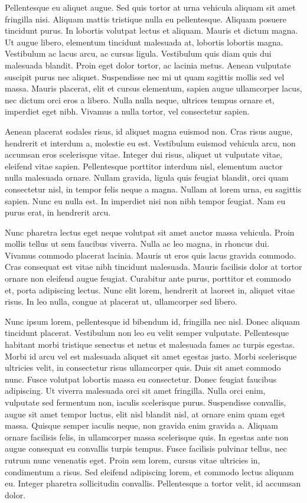 Pellentesque eu aliquet augue. Sed quis tortor at urna vehicula
aliquam sit amet fringilla nisi. Aliquam mattis tristique nulla eu
pellentesque. Aliquam posuere tincidunt purus. In lobortis volutpat
lectus et aliquam. Mauris et dictum magna. Ut augue libero, elementum
tincidunt malesuada at, lobortis lobortis magna. Vestibulum ac lacus
arcu, ac cursus ligula. Vestibulum quis diam quis dui malesuada
blandit. Proin eget dolor tortor, ac lacinia metus. Aenean vulputate
suscipit purus nec aliquet. Suspendisse nec mi ut quam sagittis mollis
sed vel massa. Mauris placerat, elit et cursus elementum, sapien augue
ullamcorper lacus, nec dictum orci eros a libero. Nulla nulla neque,
ultrices tempus ornare et, imperdiet eget nibh. Vivamus a nulla
tortor, vel consectetur sapien.

Aenean placerat sodales risus, id aliquet magna euismod non. Cras
risus augue, hendrerit et interdum a, molestie eu est. Vestibulum
euismod vehicula arcu, non accumsan eros scelerisque vitae. Integer
dui risus, aliquet ut vulputate vitae, eleifend vitae
sapien. Pellentesque porttitor interdum nisl, elementum auctor nulla
malesuada ornare. Nullam gravida, ligula quis feugiat blandit, orci
quam consectetur nisl, in tempor felis neque a magna. Nullam at lorem
urna, eu sagittis sapien. Nunc eu nulla est. In imperdiet nisi non
nibh tempor feugiat. Nam eu purus erat, in hendrerit arcu.

Nunc pharetra lectus eget neque volutpat sit amet auctor massa
vehicula. Proin mollis tellus ut sem faucibus viverra. Nulla ac leo
magna, in rhoncus dui. Vivamus commodo placerat lacinia. Mauris ut
eros quis lacus gravida commodo. Cras consequat est vitae nibh
tincidunt malesuada. Mauris facilisis dolor at tortor ornare non
eleifend augue feugiat. Curabitur ante purus, porttitor et commodo et,
porta adipiscing lectus. Nunc elit lorem, hendrerit at laoreet in,
aliquet vitae risus. In leo nulla, congue at placerat ut, ullamcorper
sed libero.

Nunc ipsum lorem, pellentesque id bibendum id, fringilla nec
nisl. Donec aliquam tincidunt placerat. Vestibulum non leo eu velit
semper vulputate. Pellentesque habitant morbi tristique senectus et
netus et malesuada fames ac turpis egestas. Morbi id arcu vel est
malesuada aliquet sit amet egestas justo. Morbi scelerisque ultricies
velit, in consectetur risus ullamcorper quis. Duis sit amet commodo
nunc. Fusce volutpat lobortis massa eu consectetur. Donec feugiat
faucibus adipiscing. Ut viverra malesuada orci sit amet
fringilla. Nulla orci enim, vulputate sed fermentum non, iaculis
scelerisque purus. Suspendisse convallis, augue sit amet tempor
luctus, elit nisl blandit nisl, at ornare enim quam eget
massa. Quisque semper iaculis neque, non gravida enim gravida
a. Aliquam ornare facilisis felis, in ullamcorper massa scelerisque
quis. In egestas ante non augue consequat eu convallis turpis
tempus. Fusce facilisis pulvinar tellus, nec rutrum nunc venenatis
eget. Proin sem lorem, cursus vitae ultricies in, condimentum a
risus. Sed eleifend adipiscing lorem, et commodo lectus aliquam
eu. Integer pharetra sollicitudin convallis. Pellentesque a tortor
velit, id accumsan dolor.


